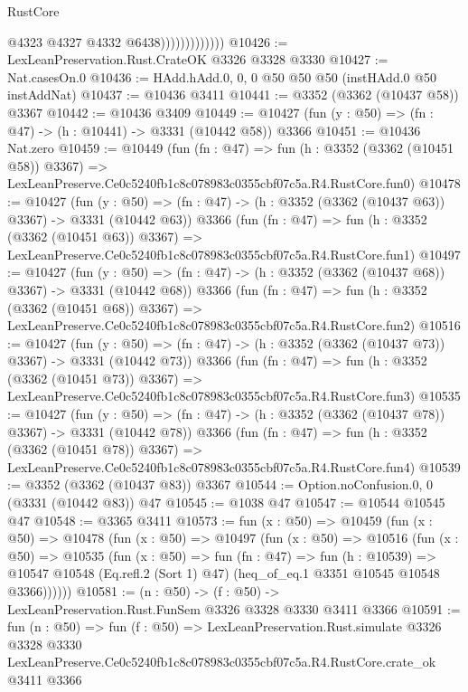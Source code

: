 \begin{lexlean}{RustCore}
\begin{coremodule}
                              @4323
                              @4327
                              @4332
                              @6438)))))))))))))
@10426 := LexLeanPreservation.Rust.CrateOK @3326 @3328 @3330
@10427 := Nat.casesOn.{0}
@10436 := HAdd.hAdd.{0, 0, 0} @50 @50 @50 (instHAdd.{0} @50 instAddNat)
@10437 := @10436 @3411
@10441 := @3352 (@3362 (@10437 @58)) @3367
@10442 := @10436 @3409
@10449 := @10427 (fun (y : @50) => (fn : @47) -> (h : @10441) -> @3331 (@10442 @58)) @3366
@10451 := @10436 Nat.zero
@10459 := @10449
    (fun (fn : @47) =>
    fun (h : @3352 (@3362 (@10451 @58)) @3367) =>
    LexLeanPreserve.Ce0c5240fb1c8c078983c0355cbf07c5a.R4.RustCore.fun0)
@10478 := @10427
    (fun (y : @50) => (fn : @47) -> (h : @3352 (@3362 (@10437 @63)) @3367) -> @3331 (@10442 @63))
    @3366
    (fun (fn : @47) =>
    fun (h : @3352 (@3362 (@10451 @63)) @3367) =>
    LexLeanPreserve.Ce0c5240fb1c8c078983c0355cbf07c5a.R4.RustCore.fun1)
@10497 := @10427
    (fun (y : @50) => (fn : @47) -> (h : @3352 (@3362 (@10437 @68)) @3367) -> @3331 (@10442 @68))
    @3366
    (fun (fn : @47) =>
    fun (h : @3352 (@3362 (@10451 @68)) @3367) =>
    LexLeanPreserve.Ce0c5240fb1c8c078983c0355cbf07c5a.R4.RustCore.fun2)
@10516 := @10427
    (fun (y : @50) => (fn : @47) -> (h : @3352 (@3362 (@10437 @73)) @3367) -> @3331 (@10442 @73))
    @3366
    (fun (fn : @47) =>
    fun (h : @3352 (@3362 (@10451 @73)) @3367) =>
    LexLeanPreserve.Ce0c5240fb1c8c078983c0355cbf07c5a.R4.RustCore.fun3)
@10535 := @10427
    (fun (y : @50) => (fn : @47) -> (h : @3352 (@3362 (@10437 @78)) @3367) -> @3331 (@10442 @78))
    @3366
    (fun (fn : @47) =>
    fun (h : @3352 (@3362 (@10451 @78)) @3367) =>
    LexLeanPreserve.Ce0c5240fb1c8c078983c0355cbf07c5a.R4.RustCore.fun4)
@10539 := @3352 (@3362 (@10437 @83)) @3367
@10544 := Option.noConfusion.{0, 0} (@3331 (@10442 @83)) @47
@10545 := @1038 @47
@10547 := @10544 @10545 @47
@10548 := @3365 @3411
@10573 := fun (x : @50) =>
  @10459
    (fun (x : @50) =>
    @10478
      (fun (x : @50) =>
      @10497
        (fun (x : @50) =>
        @10516
          (fun (x : @50) =>
          @10535
            (fun (x : @50) =>
            fun (fn : @47) =>
            fun (h : @10539) =>
            @10547 @10548 (Eq.refl.{2} (Sort 1) @47) (heq_of_eq.{1} @3351 @10545 @10548 @3366))))))
@10581 := (n : @50) -> (f : @50) -> LexLeanPreservation.Rust.FunSem @3326 @3328 @3330 @3411 @3366
@10591 := fun (n : @50) =>
  fun (f : @50) =>
  LexLeanPreservation.Rust.simulate
    @3326
    @3328
    @3330
    LexLeanPreserve.Ce0c5240fb1c8c078983c0355cbf07c5a.R4.RustCore.crate_ok
    @3411
    @3366
\end{coremodule}
\end{lexlean}
